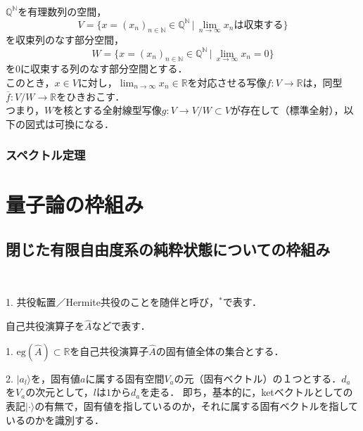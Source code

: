 \documentclass[uplatex, dvipdfmx]{jsreport}
\begin{document}
\begin{theorem}[Cauchy列による実数体の構成]　\\
    $\mathbb{Q}^\mathbb{N}$を有理数列の空間，
    $$V=\{ x=(x_n)_{n\in\mathbb{N}} \in\mathbb{Q}^\mathbb{N} \,|\, \lim_{n\to\infty} x_nは収束する \}$$
    を収束列のなす部分空間，
    $$W=\{x=(x_n)_{n\in\mathbb{N}}\in\mathbb{Q}^\mathbb{N}\, |\, \lim_{x\to\infty} x_n=0\}$$
    を$0$に収束する列のなす部分空間とする．\\
    このとき，$x\in V$に対し，$\lim_{n\to\infty}x_n\in\mathbb{R}$を対応させる写像$f:V\longrightarrow \mathbb{R}$は，同型$\overline{f}:V/W\longrightarrow\mathbb{R}$をひきおこす．\\
    つまり，$W$を核とする全射線型写像$g:V\longrightarrow V/W\subset V$が存在して（標準全射），以下の図式は可換になる．
    \begin{center}
    \end{center}

\end{theorem}

\section{スペクトル定理}

\part{量子論の枠組み}

\chapter{閉じた有限自由度系の純粋状態についての枠組み}

\begin{notation}[ヒルベルト空間と状態]　

    1. 共役転置／Hermite共役のことを随伴と呼び，${}^*$で表す．
\end{notation}
\begin{notation}[可観測量と作用素]自己共役演算子を$\hat{A}$などで表す．

    1. $\mathrm{eg}(\hat{A})\subset\mathbb{R}$を自己共役演算子$\hat{A}$の固有値全体の集合とする．

    2. $|a_l\rangle$を，固有値$a$に属する固有空間$V_a$の元（固有ベクトル）の１つとする．$d_a$を$V_a$の次元として，$l$は$1$から$d_a$を走る．
    即ち，基本的に，ketベクトルとしての表記$|\cdot\rangle$の有無で，固有値を指しているのか，それに属する固有ベクトルを指しているのかを識別する．
\end{notation}
\end{document}
